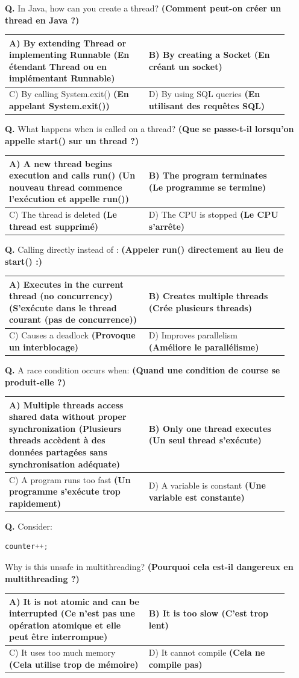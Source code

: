 \documentclass[11pt,a4paper]{article}
\newcounter{qnum}
\newcommand{\Q}{%
	\stepcounter{qnum}%
	\noindent\textbf{Q\theqnum. }%
}
\DeclareRobustCommand{\code}[1]{\texttt{\detokenize{#1}}}
\newcommand{\choices}[4]{%
	\setlength{\tabcolsep}{4pt}%
	\renewcommand{\arraystretch}{1.15}%
	\begin{tabular}{|p{0.46\linewidth}|p{0.46\linewidth}|}
		\hline
		A) #1 & B) #2 \\ \hline
		C) #3 & D) #4 \\ \hline
	\end{tabular}%
}
\begin{document}
	\Q In Java, how can you create a thread? \textbf{(Comment peut-on créer un thread en Java ?) }
	
	\choices
	{By extending Thread or implementing Runnable \textbf{(En étendant Thread ou en implémentant Runnable)}}
	{By creating a Socket \textbf{(En créant un socket)}}
	{By calling System.exit() \textbf{(En appelant System.exit())}}
	{By using SQL queries \textbf{(En utilisant des requêtes SQL)}}
	
	\Q What happens when \code{start()} is called on a thread? \textbf{(Que se passe-t-il lorsqu’on appelle start() sur un thread ?) }
	
	\choices
	{A new thread begins execution and calls run() \textbf{(Un nouveau thread commence l’exécution et appelle run())}}
	{The program terminates \textbf{(Le programme se termine)}}
	{The thread is deleted \textbf{(Le thread est supprimé)}}
	{The CPU is stopped \textbf{(Le CPU s’arrête)}}
	
	\Q Calling \code{run()} directly instead of \code{start()}: \textbf{(Appeler run() directement au lieu de start() :) }
	
	\choices
	{Executes in the current thread (no concurrency) \textbf{(S’exécute dans le thread courant (pas de concurrence))}}
	{Creates multiple threads \textbf{(Crée plusieurs threads)}}
	{Causes a deadlock \textbf{(Provoque un interblocage)}}
	{Improves parallelism \textbf{(Améliore le parallélisme)}}
	
	\Q A race condition occurs when: \textbf{(Quand une condition de course se produit-elle ?) }
	
	\choices
	{Multiple threads access shared data without proper synchronization \textbf{(Plusieurs threads accèdent à des données partagées sans synchronisation adéquate)}}
	{Only one thread executes \textbf{(Un seul thread s’exécute)}}
	{A program runs too fast \textbf{(Un programme s’exécute trop rapidement)}}
	{A variable is constant \textbf{(Une variable est constante)}}
	
	\Q Consider:
	\begin{lstlisting}[language=Java]
		counter++;
	\end{lstlisting}
	
	Why is this unsafe in multithreading? \textbf{(Pourquoi cela est-il dangereux en multithreading ?) }
	
	\choices
	{It is not atomic and can be interrupted \textbf{(Ce n’est pas une opération atomique et elle peut être interrompue)}}
	{It is too slow \textbf{(C’est trop lent)}}
	{It uses too much memory \textbf{(Cela utilise trop de mémoire)}}
	{It cannot compile \textbf{(Cela ne compile pas)}}
	
\end{document}
